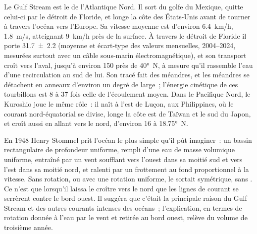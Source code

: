 Le Gulf Stream est le  de l'Atlantique Nord. Il sort
du golfe du Mexique, quitte celui-ci par le détroit de Floride, et longe la côte des
États-Unis avant de tourner à travers l'océan vers l'Europe. Sa vitesse moyenne
est d'environ \qty{6.4}{km/h}, \qty{1.8}{m/s}, atteignant \qty{9}{km/h} près de la
surface. À travers le détroit de Floride il porte
\qty[uncertainty-mode=separate]{31.7 \pm 2.2}{\sverdrup} (moyenne et écart-type
des valeurs mensuelles, 2004--2024, mesurées surtout avec un câble sous-marin
électromagnétique), et son transport croît
vers l'aval, jusqu'à environ \qty{150}{\sverdrup} près de \ang{40}~N, à mesure qu'il rassemble l'eau
d'une recirculation au sud de lui. Son tracé fait des méandres, et les méandres se détachent en anneaux
d'environ un degré de large~; l'énergie cinétique de ces tourbillons est 8 à 37 fois celle de
l'écoulement moyen. Dans le Pacifique Nord, le Kuroshio joue le même rôle~: il naît
à l'est de Luçon, aux Philippines, où le courant nord-équatorial se divise, longe la
côte est de Taïwan et le sud du Japon, et croît aussi en allant vers le nord, d'environ
\qty{16}{\sverdrup} à \ang{18.75}~N.

\begin{history}[Stommel 1948]
En 1948 Henry Stommel prit l'océan le plus simple qu'il pût imaginer~: un bassin rectangulaire
de profondeur uniforme, rempli d'une eau de masse volumique uniforme, entraîné par un vent soufflant
vers l'ouest dans sa moitié sud et vers l'est dans sa moitié nord, et
ralenti par un frottement au fond proportionnel à la vitesse. Sans rotation,
ou avec une rotation uniforme, le  sortait symétrique, sans . Ce n'est que lorsqu'il laissa le  croître vers le nord que les
lignes de courant se serrèrent contre le bord ouest. Il suggéra que c'était la principale
raison du Gulf Stream et des autres courants intenses des océans~;
l'explication, en termes de rotation donnée à l'eau par le vent et retirée au
bord ouest, relève du volume de troisième année.
\end{history}

